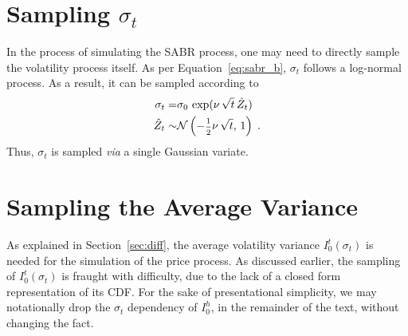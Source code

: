 \documentclass[12pt,oneside]{article}
\newcommand{\beqn}{\begin{equation}}
\newcommand{\eeqn}{\end{equation}}
\newcommand{\half}{\text{\scriptsize\ensuremath{\frac{1}{2}}}}
\numberwithin{equation}{section}
\begin{document}
\section{Sampling $\sigma_t$}
In the process of simulating the SABR process, one may need to directly sample
the volatility process itself.
As per Equation~\eqref{eq:sabr_b}, $\sigma_t$ follows a log-normal process.
As a result, it can be sampled according to
\beqn\label{eq:sig_sim}
\begin{aligned}
\sigma_t=&\sigma_0\,\exp(\nu\,\sqrt{t}\,\hat{Z}_t)\\
\hat{Z}_t\sim&\mathcal{N}\left(-\half\nu\,\sqrt{t},\,1\right)\;.
\end{aligned}
\eeqn
Thus, $\sigma_t$ is sampled {\em via} a single Gaussian variate.

\section{Sampling the Average Variance}
As explained in Section~\ref{sec:diff}, the average volatility variance $I_0^t(\sigma_t)$
is needed for the simulation of the price process.
As discussed earlier, the sampling of $I_0^t(\sigma_t)$ is fraught with difficulty,
due to the lack of a closed form representation of its CDF.
For the sake of presentational simplicity, we may notationally drop the $\sigma_t$ dependency of
$I_0^h$, in the remainder of the text, without changing the fact.
\end{document}
